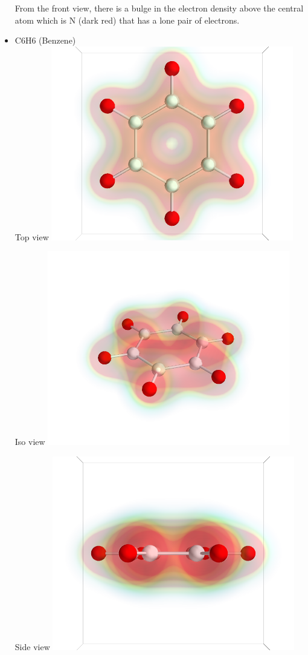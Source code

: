 \documentclass[11pt]{article}
\begin{document}
\begin{itemize}
From the front view, there is a bulge in the electron density above the central atom which is N (dark red) that has a lone pair of electrons.


\item C6H6 (Benzene)\\
\label{sec-1-6-1-5}%
Top view
\includegraphics[width=.9\linewidth]{./images/C6H6_top.png}

Iso view
\includegraphics[width=.9\linewidth]{./images/C6H6_iso.png}

Side view
\includegraphics[width=.9\linewidth]{./images/C6H6_side.png}


\end{itemize}
\end{document}
